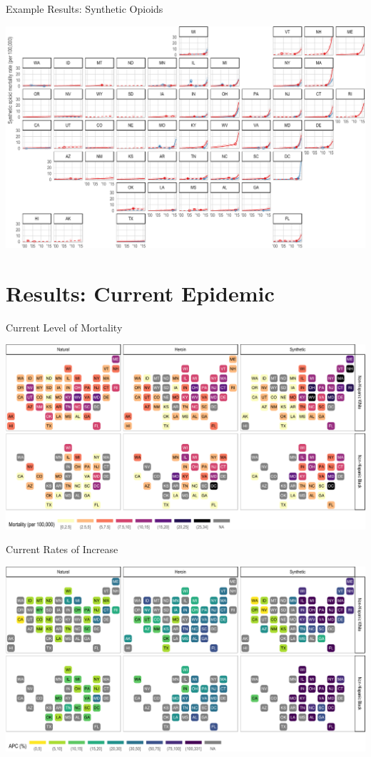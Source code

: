 \documentclass[ignorenonframetext,compress]{beamer}
\begin{document}
\begin{frame}{Example Results: Synthetic Opioids}

\includegraphics{epc_slides_files/figure-beamer/unnamed-chunk-7-1.pdf}

\end{frame}

\section{Results: Current Epidemic}\label{results-current-epidemic}

\begin{frame}{Current Level of Mortality}

\includegraphics{epc_slides_files/figure-beamer/unnamed-chunk-8-1.pdf}

\end{frame}

\begin{frame}{Current Rates of Increase}

\includegraphics{epc_slides_files/figure-beamer/unnamed-chunk-9-1.pdf}

\end{frame}
\end{document}
